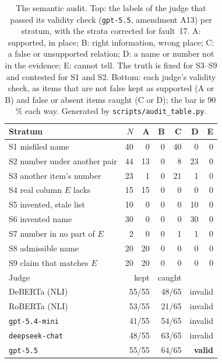 \documentclass[journal]{IEEEtran}
\begin{document}
\begin{table}[!htbp]
\caption{The semantic audit. Top: the labels of the judge that passed its
validity check (\texttt{gpt-5.5}, amendment A13) per stratum, with the strata
corrected for fault~17. A: supported, in place; B: right information, wrong
place; C: a false or unsupported relation; D: a name or number not in the
evidence; E: cannot tell. The truth is fixed for S3--S9 and contested for S1
and S2. Bottom: each judge's validity check, as items that are not false kept
as supported (A or B) and false or absent items caught (C or D); the bar is
90\,\% each way. Generated by \texttt{scripts/audit\_table.py}.}
\label{tab:audit}
\centering
\footnotesize
\setlength{\tabcolsep}{3pt}
\begin{tabular}{@{}lrrrrrr@{}}
\toprule
Stratum & $N$ & A & B & C & D & E \\
\midrule
S1 misfiled name & 40 & 0 & 0 & 40 & 0 & 0 \\
S2 number under another pair & 44 & 13 & 0 & 8 & 23 & 0 \\
S3 another item's number & 23 & 1 & 0 & 21 & 1 & 0 \\
S4 real column $E$ lacks & 15 & 15 & 0 & 0 & 0 & 0 \\
S5 invented, stale list & 10 & 0 & 0 & 0 & 10 & 0 \\
S6 invented name & 30 & 0 & 0 & 0 & 30 & 0 \\
S7 number in no part of $E$ & 2 & 0 & 0 & 1 & 1 & 0 \\
S8 admissible name & 20 & 20 & 0 & 0 & 0 & 0 \\
S9 claim that matches $E$ & 20 & 20 & 0 & 0 & 0 & 0 \\
\midrule
Judge & \multicolumn{2}{r}{kept} & \multicolumn{2}{r}{caught} & \multicolumn{2}{r}{} \\
\midrule
DeBERTa (NLI) & \multicolumn{2}{r}{55/55} & \multicolumn{2}{r}{48/65} & \multicolumn{2}{r}{invalid} \\
RoBERTa (NLI) & \multicolumn{2}{r}{53/55} & \multicolumn{2}{r}{21/65} & \multicolumn{2}{r}{invalid} \\
\texttt{gpt-5.4-mini} & \multicolumn{2}{r}{41/55} & \multicolumn{2}{r}{54/65} & \multicolumn{2}{r}{invalid} \\
\texttt{deepseek-chat} & \multicolumn{2}{r}{48/55} & \multicolumn{2}{r}{63/65} & \multicolumn{2}{r}{invalid} \\
\texttt{gpt-5.5} & \multicolumn{2}{r}{55/55} & \multicolumn{2}{r}{64/65} & \multicolumn{2}{r}{\textbf{valid}} \\
\bottomrule
\end{tabular}
\end{table}
\end{document}
